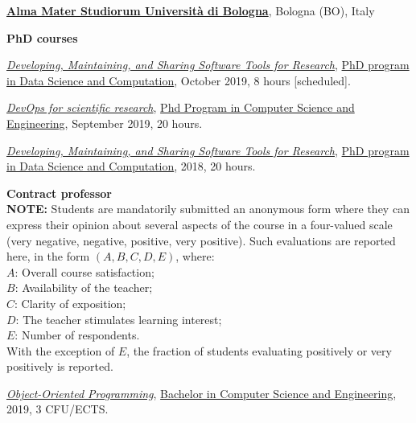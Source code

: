 \href{http://www.unibo.it}{\textbf{Alma Mater Studiorum Università di Bologna}}, Bologna (BO), Italy
\begin{outerlist}
\item[] \textbf{PhD courses} %
    \begin{innerlist}
      \item \href{https://bitbucket.org/danysk/courses-2018-developing-maintaining-and-sharing-software-tools/downloads/}{\textit{Developing, Maintaining, and Sharing Software Tools for Research}}, \href{http://archive.fo/Fmxxm}{PhD program in Data Science and Computation}, October 2019, 8 hours [scheduled].
      \item \href{http://archive.fo/HKAC6/}{\textit{DevOps for scientific research}}, \href{http://archive.fo/ppTiB}{Phd Program in Computer Science and Engineering}, September 2019, 20 hours.
      \item \href{https://bitbucket.org/danysk/courses-2018-developing-maintaining-and-sharing-software-tools/downloads/}{\textit{Developing, Maintaining, and Sharing Software Tools for Research}}, \href{http://archive.fo/Fmxxm}{PhD program in Data Science and Computation}, 2018, 20 hours.
    \end{innerlist}
\item[] \textbf{Contract professor} %
    \scriptsize{\\ \textbf{NOTE:} Students are mandatorily submitted an anonymous form where they can express their opinion about several aspects of the course in a four-valued scale (very negative, negative, positive, very positive). Such evaluations are reported here, in the form $(A, B, C, D, E)$, where:
    \\$A$: Overall course satisfaction;
    \\$B$: Availability of the teacher;
    \\$C$: Clarity of exposition;
    \\$D$: The teacher stimulates learning interest;
    \\$E$: Number of respondents.
    \\With the exception of $E$, the fraction of students evaluating positively or very positively is reported.
    }
    \normalsize
    \begin{innerlist}
      \item \href{http://archive.fo/JtEDW}{\textit{Object-Oriented Programming}}, \href{http://archive.fo/UM5wl}{Bachelor in Computer Science and Engineering}, 2019, 3 CFU/ECTS.

\end{innerlist}
\end{outerlist}
